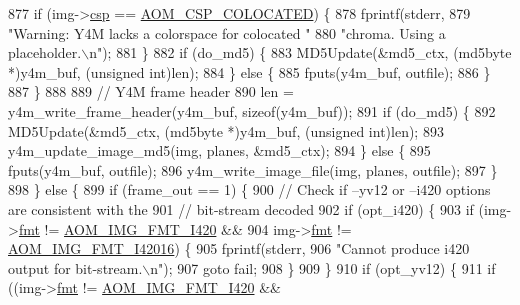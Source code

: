 \begin{DoxyCodeInclude}
{{{{{{{{{{{{{{{{{{{{{{{{{{{{{{{{{{{{{{{{{{{{{{{877               \textcolor{keywordflow}{if} (img->\hyperlink{structaom__image_a4f235c521bc95a061e9e0b2a3d5d457e}{csp} == \hyperlink{aom__image_8h_a10590253ef3dbde7e93ed5d4b4e0e73ba01ef7204c2234ef43acfd493d5e18c84}{AOM\_CSP\_COLOCATED}) \{
878                 fprintf(stderr,
879                         \textcolor{stringliteral}{"Warning: Y4M lacks a colorspace for colocated "}
880                         \textcolor{stringliteral}{"chroma. Using a placeholder.\(\backslash\)n"});
881               \}
882               \textcolor{keywordflow}{if} (do\_md5) \{
883                 MD5Update(&md5\_ctx, (md5byte *)y4m\_buf, (\textcolor{keywordtype}{unsigned} \textcolor{keywordtype}{int})len);
884               \} \textcolor{keywordflow}{else} \{
885                 fputs(y4m\_buf, outfile);
886               \}
887             \}
888 
889             \textcolor{comment}{// Y4M frame header}
890             len = y4m\_write\_frame\_header(y4m\_buf, \textcolor{keyword}{sizeof}(y4m\_buf));
891             \textcolor{keywordflow}{if} (do\_md5) \{
892               MD5Update(&md5\_ctx, (md5byte *)y4m\_buf, (\textcolor{keywordtype}{unsigned} \textcolor{keywordtype}{int})len);
893               y4m\_update\_image\_md5(img, planes, &md5\_ctx);
894             \} \textcolor{keywordflow}{else} \{
895               fputs(y4m\_buf, outfile);
896               y4m\_write\_image\_file(img, planes, outfile);
897             \}
898           \} \textcolor{keywordflow}{else} \{
899             \textcolor{keywordflow}{if} (frame\_out == 1) \{
900               \textcolor{comment}{// Check if --yv12 or --i420 options are consistent with the}
901               \textcolor{comment}{// bit-stream decoded}
902               \textcolor{keywordflow}{if} (opt\_i420) \{
903                 \textcolor{keywordflow}{if} (img->\hyperlink{structaom__image_a6c64b1ab918d80d52eb8f5d6d957e825}{fmt} != \hyperlink{aom__image_8h_a930317c04b4bd0a660bb5e744055523cabd778a3d697463e89d12a1117f417b60}{AOM\_IMG\_FMT\_I420} &&
904                     img->\hyperlink{structaom__image_a6c64b1ab918d80d52eb8f5d6d957e825}{fmt} != \hyperlink{aom__image_8h_a930317c04b4bd0a660bb5e744055523ca20a9cf30277260685642b4cfb4e9273b}{AOM\_IMG\_FMT\_I42016}) \{
905                   fprintf(stderr,
906                           \textcolor{stringliteral}{"Cannot produce i420 output for bit-stream.\(\backslash\)n"});
907                   \textcolor{keywordflow}{goto} fail;
908                 \}
909               \}
910               \textcolor{keywordflow}{if} (opt\_yv12) \{
911                 \textcolor{keywordflow}{if} ((img->\hyperlink{structaom__image_a6c64b1ab918d80d52eb8f5d6d957e825}{fmt} != \hyperlink{aom__image_8h_a930317c04b4bd0a660bb5e744055523cabd778a3d697463e89d12a1117f417b60}{AOM\_IMG\_FMT\_I420} &&
}}}}}}}}}}}}}}}}}}}}}}}}}}}}}}}}}}}}}}}}}}}}}}}
\end{DoxyCodeInclude}
